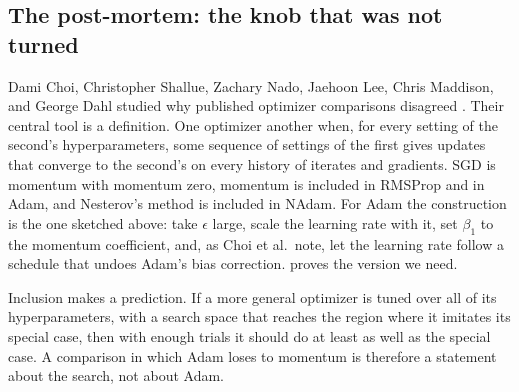 \begin{refsection}
\section{The post-mortem: the knob that was not turned}\label{sec:budgets:postmortem}

Dami Choi, Christopher Shallue, Zachary Nado, Jaehoon Lee, Chris Maddison, and George Dahl studied why published optimizer comparisons disagreed \parencite{ChoiEtAl2019}. Their central tool is a definition. One optimizer  another when, for every setting of the second's hyperparameters, some sequence of settings of the first gives updates that converge to the second's on every history of iterates and gradients. SGD is momentum with momentum zero, momentum is included in RMSProp and in Adam, and Nesterov's method is included in NAdam. For Adam the construction is the one sketched above: take $\epsilon$ large, scale the learning rate with it, set $\beta_1$ to the momentum coefficient, and, as Choi et al.\ note, let the learning rate follow a schedule that undoes Adam's bias correction.  proves the version we need.

Inclusion makes a prediction. If a more general optimizer is tuned over all of its hyperparameters, with a search space that reaches the region where it imitates its special case, then with enough trials it should do at least as well as the special case. A comparison in which Adam loses to momentum is therefore a statement about the search, not about Adam.

\begin{experiment}[Choi et al.\ 2019]
\end{experiment}


\end{refsection}
